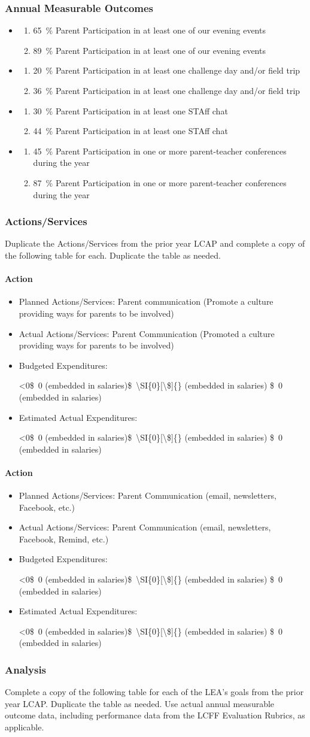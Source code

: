 \documentclass{article}
\makeatletter
\newcommand{\dollar}[1]{\SI{#1}[\$]{}}
\newcommand{\trydollar}[1]{
	\ifnum0<0#1\relax\dollar{#1}
	\else
		#1
	\fi
}
\newcounter{goal}[section] %
\newcommand*{\expact}[1]{%
	\expandafter\@expact\csname c@#1\endcsname%
}
\newcommand*{\@expact}[1]{%
	$\ifcase\intcalcAdd{1}{\intcalcMod{\intcalcSub{#1}{1}}{2}}
		\or{\text{Expected:}}
		\or{\text{Actual:}}
    \else\@ctrerr\fi$
}
\newcommand{\outcome}[2]{
	\item
	\begin{enumerate}[label=\expact*]
	\setlength{\itemsep}{0pt}
	\item #1
	\item #2
	\end{enumerate}
}
\newenvironment{outcomes}
	{
		\subsubsection{Annual Measurable Outcomes}
		\begin{itemize}[label={}]
	}
	{\end{itemize}}
\newcounter{action}[goal]
\newcommand{\actionupdate}[4]{
	\stepcounter{action}
	\paragraph{Action \theaction}
	\begin{itemize}[label={}]
		\item Planned Actions/Services: #1
		\item Actual Actions/Services: #2
		\item Budgeted Expenditures: 
			\trydollar{#3}
		\item Estimated Actual Expenditures: 
			\trydollar{#4}
	\end{itemize}
}
\makeatother
\begin{document}
\begin{outcomes}
	\outcome
	{\SI{65}{\percent} Parent Participation in at least one of our evening events}
	{\SI{89}{\percent} Parent Participation in at least one of our evening events}
	\outcome
	{\SI{20}{\percent} Parent Participation in at least one challenge day and/or field trip}
	{\SI{36}{\percent} Parent Participation in at least one challenge day and/or field trip}
	\outcome
	{\SI{30}{\percent} Parent Participation in at least one STAff chat}
	{\SI{44}{\percent} Parent Participation in at least one STAff chat}
	\outcome
	{\SI{45}{\percent} Parent Participation in one or more parent-teacher conferences during the year}
	{\SI{87}{\percent} Parent Participation in one or more parent-teacher conferences during the year}
\end{outcomes}

\subsubsection{Actions/Services}
Duplicate the Actions/Services from the prior year LCAP and complete a copy of the following table for each. Duplicate the table as needed.
\actionupdate
	{Parent communication (Promote a culture providing ways for parents to be involved)}
	{Parent Communication (Promoted a culture providing ways for parents to be involved)}
	{\dollar{0} (embedded in salaries)}
	{\dollar{0} (embedded in salaries)}

\actionupdate
	{Parent Communication (email, newsletters, Facebook, etc.)}
	{Parent Communication (email, newsletters, Facebook, Remind, etc.)}
	{\dollar{0} (embedded in salaries)}
	{\dollar{0} (embedded in salaries)}

\subsubsection{Analysis}
Complete a copy of the following table for each of the LEA's goals from the prior year LCAP. Duplicate the table as needed. Use actual annual measurable outcome data, including performance data from the LCFF Evaluation Rubrics, as applicable.
\end{document}
